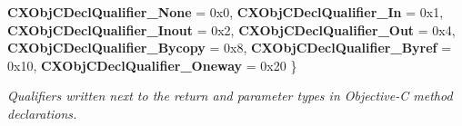 \begin{DoxyCompactItemize}
{\bfseries C\+X\+Obj\+C\+Decl\+Qualifier\+\_\+\+None} = 0x0, 
{\bfseries C\+X\+Obj\+C\+Decl\+Qualifier\+\_\+\+In} = 0x1, 
{\bfseries C\+X\+Obj\+C\+Decl\+Qualifier\+\_\+\+Inout} = 0x2, 
{\bfseries C\+X\+Obj\+C\+Decl\+Qualifier\+\_\+\+Out} = 0x4, 
\newline
{\bfseries C\+X\+Obj\+C\+Decl\+Qualifier\+\_\+\+Bycopy} = 0x8, 
{\bfseries C\+X\+Obj\+C\+Decl\+Qualifier\+\_\+\+Byref} = 0x10, 
{\bfseries C\+X\+Obj\+C\+Decl\+Qualifier\+\_\+\+Oneway} = 0x20
 \}
\begin{DoxyCompactList}\small\item\em \textquotesingle{}Qualifiers\textquotesingle{} written next to the return and parameter types in Objective-\/C method declarations. \end{DoxyCompactList}\end{DoxyCompactItemize}
